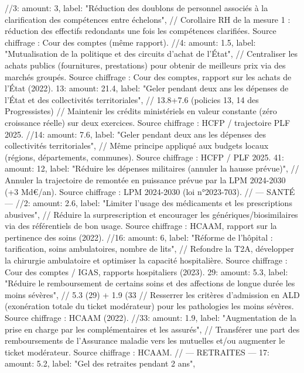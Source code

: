 {{{{{{{{{{{{		//3:  { amount: 3,    label: "Réduction des doublons de personnel associés à la clarification des compétences entre échelons"},
			  // Corollaire RH de la mesure 1 : réduction des effectifs redondants une fois les compétences clarifiées. Source chiffrage : Cour des comptes (même rapport).
		//4:  { amount: 1.5,  label: "Mutualisation de la politique et des circuits d'achat de l'État"},
			  // Centraliser les achats publics (fournitures, prestations) pour obtenir de meilleurs prix via des marchés groupés. Source chiffrage : Cour des comptes, rapport sur les achats de l'État (2022).
		13: { amount: 21.4, label: "Geler pendant deux ans les dépenses de l'État et des collectivités territoriales"}, // 13.8+7.6 (policies 13, 14 des Progressistes)
			  // Maintenir les crédits ministériels en valeur constante (zéro croissance réelle) sur deux exercices. Source chiffrage : HCFP / trajectoire PLF 2025.
		//14: { amount: 7.6,  label: "Geler pendant deux ans les dépenses des collectivités territoriales"},
			  // Même principe appliqué aux budgets locaux (régions, départements, communes). Source chiffrage : HCFP / PLF 2025.
		41: { amount: 12,   label: "Réduire les dépenses militaires (annuler la hausse prévue)"},
			  // Annuler la trajectoire de remontée en puissance prévue par la LPM 2024-2030 (+3 Md€/an). Source chiffrage : LPM 2024-2030 (loi n°2023-703).
		// --- SANTÉ ---
		//2:  { amount: 2.6,  label: "Limiter l'usage des médicaments et les prescriptions abusives"},
			  // Réduire la surprescription et encourager les génériques/biosimilaires via des référentiels de bon usage. Source chiffrage : HCAAM, rapport sur la pertinence des soins (2022).
		//16: { amount: 6,    label: "Réforme de l'hôpital : tarification, soins ambulatoires, nombre de lits"},
			  // Refondre la T2A, développer la chirurgie ambulatoire et optimiser la capacité hospitalière. Source chiffrage : Cour des comptes / IGAS, rapports hospitaliers (2023).
		29: { amount: 5.3,  label: "Réduire le remboursement de certains soins et des affections de longue durée les moins sévères"}, // 5.3 (29) + 1.9 (33
			  // Resserrer les critères d'admission en ALD (exonération totale du ticket modérateur) pour les pathologies les moins sévères. Source chiffrage : HCAAM (2022).
		//33: { amount: 1.9,  label: "Augmentation de la prise en charge par les complémentaires et les assurés"},
			  // Transférer une part des remboursements de l'Assurance maladie vers les mutuelles et/ou augmenter le ticket modérateur. Source chiffrage : HCAAM.
		// --- RETRAITES ---
		17: { amount: 5.2,  label: "Gel des retraites pendant 2 ans"},
}}}}}}}}}}}}

